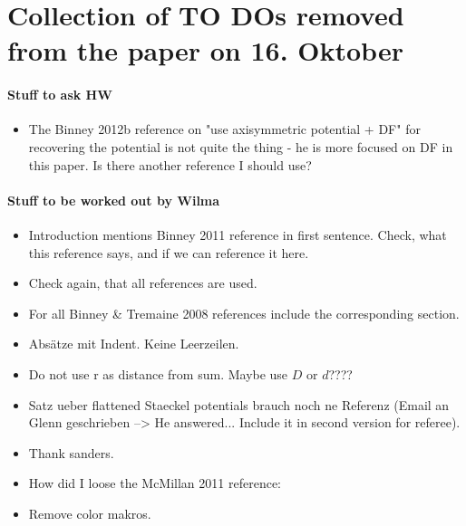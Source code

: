 \section{Collection of TO DOs removed from the paper on 16. Oktober}

\paragraph{Stuff to ask HW}
\begin{itemize}
\item The Binney 2012b reference on "use axisymmetric potential + DF" for recovering the potential is not quite the thing - he is more focused on DF in this paper. Is there another reference I should use?
\end{itemize}

\paragraph{Stuff to be worked out by Wilma}
\begin{itemize}
\item Introduction mentions Binney 2011 reference in first sentence. Check, what this reference says, and if we can reference it here.
\item Check again, that all references are used.
\item For all Binney \& Tremaine 2008 references include the corresponding section.
\item Absätze mit Indent. Keine Leerzeilen.
\item Do not use r as distance from sum. Maybe use $D$ or $d$????
\item Satz ueber flattened Staeckel potentials brauch noch ne Referenz (Email an Glenn geschrieben --> He answered... Include it in second version for referee).
\item Thank sanders.
\item How did I loose the McMillan 2011 reference: %
\item Remove color makros.
\end{itemize}

